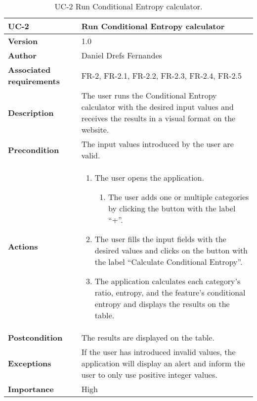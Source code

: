 \begin{table}[p]
	\centering
	\begin{tabularx}{\linewidth}{ p{} p{} }
		\toprule
		\textbf{UC-2}    & \textbf{Run Conditional Entropy calculator}\\
		\toprule
		\textbf{Version}              & 1.0    \\
		\textbf{Author}                & Daniel Drefs Fernandes \\
		\textbf{Associated requirements} & FR-2, FR-2.1, FR-2.2, FR-2.3, FR-2.4, FR-2.5 \\
		\textbf{Description}          & The user runs the Conditional Entropy calculator with the desired input values and receives the results in a visual format on the website. \\
		\textbf{Precondition}         & The input values introduced by the user are valid. \\
		\textbf{Actions}             &
		\begin{enumerate}
			\def\labelenumi{\arabic{enumi}.}
			\tightlist
			\item The user opens the application.
            \begin{enumerate}
                \item The user adds one or multiple categories by clicking the button with the label ``+''.
            \end{enumerate}
			\item The user fills the input fields with the desired values and clicks on the button with the label ``Calculate Conditional Entropy''.
            \item The application calculates each category's ratio, entropy, and the feature's conditional entropy and displays the results on the table.
		\end{enumerate}\\
		\textbf{Postcondition}        & The results are displayed on the table. \\
		\textbf{Exceptions}          & If the user has introduced invalid values, the application will display an alert and inform the user to only use positive integer values. \\
		\textbf{Importance}          & High \\
		\bottomrule
	\end{tabularx}
	\caption{UC-2 Run Conditional Entropy calculator.}
    \label{table:uc_2}
\end{table}


